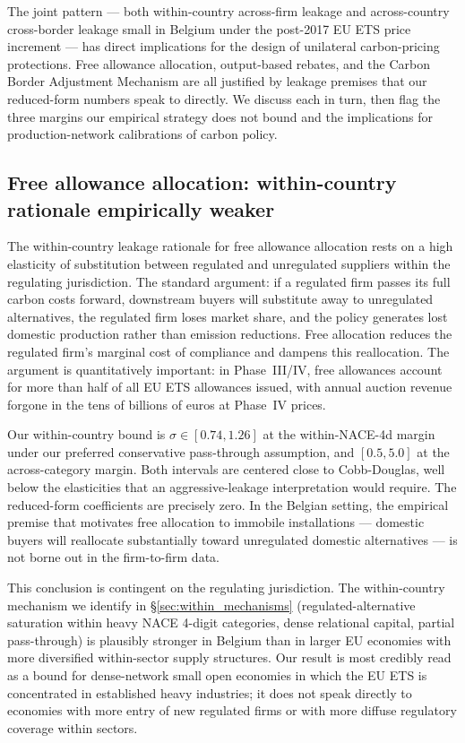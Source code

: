 The joint pattern --- both within-country across-firm leakage and across-country cross-border leakage small in Belgium under the post-2017 EU ETS price increment --- has direct implications for the design of unilateral carbon-pricing protections. Free allowance allocation, output-based rebates, and the Carbon Border Adjustment Mechanism are all justified by leakage premises that our reduced-form numbers speak to directly. We discuss each in turn, then flag the three margins our empirical strategy does not bound and the implications for production-network calibrations of carbon policy.

\subsection{Free allowance allocation: within-country rationale empirically weaker}

The within-country leakage rationale for free allowance allocation rests on a high elasticity of substitution between regulated and unregulated suppliers within the regulating jurisdiction. The standard argument: if a regulated firm passes its full carbon costs forward, downstream buyers will substitute away to unregulated alternatives, the regulated firm loses market share, and the policy generates lost domestic production rather than emission reductions. Free allocation reduces the regulated firm's marginal cost of compliance and dampens this reallocation. The argument is quantitatively important: in Phase~III/IV, free allowances account for more than half of all EU ETS allowances issued, with annual auction revenue forgone in the tens of billions of euros at Phase~IV prices.

Our within-country bound is $\sigma \in [0.74, 1.26]$ at the within-NACE-4d margin under our preferred conservative pass-through assumption, and $[0.5, 5.0]$ at the across-category margin. Both intervals are centered close to Cobb-Douglas, well below the elasticities that an aggressive-leakage interpretation would require. The reduced-form coefficients are precisely zero. In the Belgian setting, the empirical premise that motivates free allocation to immobile installations --- domestic buyers will reallocate substantially toward unregulated domestic alternatives --- is not borne out in the firm-to-firm data.

This conclusion is contingent on the regulating jurisdiction. The within-country mechanism we identify in \S\ref{sec:within_mechanisms} (regulated-alternative saturation within heavy NACE 4-digit categories, dense relational capital, partial pass-through) is plausibly stronger in Belgium than in larger EU economies with more diversified within-sector supply structures. Our result is most credibly read as a bound for dense-network small open economies in which the EU ETS is concentrated in established heavy industries; it does not speak directly to economies with more entry of new regulated firms or with more diffuse regulatory coverage within sectors.

